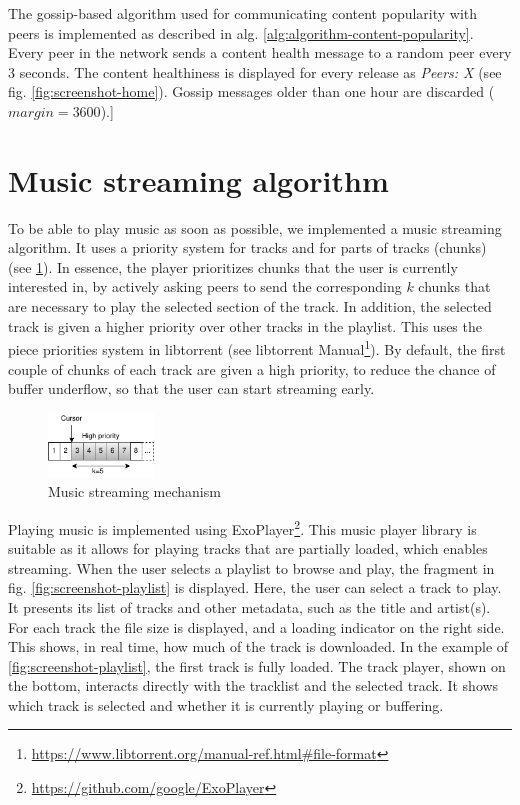The gossip-based algorithm used for communicating content popularity with peers is implemented as described in alg. \ref{alg:algorithm-content-popularity}. Every peer in the network sends a content health message to a random peer every 3 seconds. The content healthiness is displayed for every release as \textit{Peers: X} (see fig. \ref{fig:screenshot-home}). Gossip messages older than one hour are discarded ($margin=3600$).]

\section{Music streaming algorithm}
To be able to play music as soon as possible, we implemented a music streaming algorithm. It uses a priority system for tracks and for parts of tracks (chunks) (see \ref{fig:music-streaming-mechanism}). In essence, the player prioritizes chunks that the user is currently interested in, by actively asking peers to send the corresponding $k$ chunks that are necessary to play the selected section of the track. In addition, the selected track is given a higher priority over other tracks in the playlist. This uses the piece priorities system in libtorrent (see libtorrent Manual\footnote{\url{https://www.libtorrent.org/manual-ref.html\#file-format}}). By default, the first couple of chunks of each track are given a high priority, to reduce the chance of buffer underflow, so that the user can start streaming early. 
\begin{figure}
    \centering
    \includegraphics[width=0.25\textwidth]{implementation/streaming-algorithm.png}
    \caption{Music streaming mechanism}
    \label{fig:music-streaming-mechanism}
\end{figure}

Playing music is implemented using ExoPlayer\footnote{\url{https://github.com/google/ExoPlayer}}. This music player library is suitable as it allows for playing tracks that are partially loaded, which enables streaming. When the user selects a playlist to browse and play, the fragment in fig. \ref{fig:screenshot-playlist} is displayed. Here, the user can select a track to play. It presents its list of tracks and other metadata, such as the title and artist(s). For each track the file size is displayed, and a loading indicator on the right side. This shows, in real time, how much of the track is downloaded. In the example of \ref{fig:screenshot-playlist}, the first track is fully loaded. The track player, shown on the bottom, interacts directly with the tracklist and the selected track. It shows which track is selected and whether it is currently playing or buffering. 

